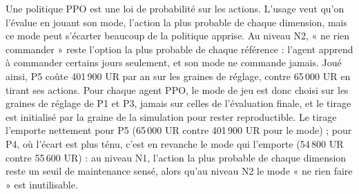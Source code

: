 Une politique PPO est une loi de probabilité sur les actions. L'usage veut qu'on l'évalue en jouant son mode, l'action la plus probable de chaque dimension, mais ce mode peut s'écarter beaucoup de la politique apprise. Au niveau N2, « ne rien commander » reste l'option la plus probable de chaque référence : l'agent apprend à commander certains jours seulement, et son mode ne commande jamais. Joué ainsi, P5 coûte 401\,900 UR par an sur les graines de réglage, contre 65\,000 UR en tirant ses actions. Pour chaque agent PPO, le mode de jeu est donc choisi sur les graines de réglage de P1 et P3, jamais sur celles de l'évaluation finale, et le tirage est initialisé par la graine de la simulation pour rester reproductible. Le tirage l'emporte nettement pour P5 (65\,000 UR contre 401\,900 UR pour le mode) ; pour P4, où l'écart est plus ténu, c'est en revanche le mode qui l'emporte (54\,800 UR contre 55\,600 UR) : au niveau N1, l'action la plus probable de chaque dimension reste un seuil de maintenance sensé, alors qu'au niveau N2 le mode « ne rien faire » est inutilisable.
